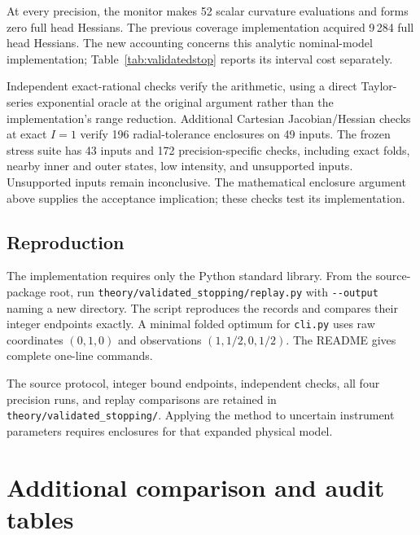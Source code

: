 \documentclass[10pt,a4paper]{article}
\begin{document}
At every precision, the monitor makes 52 scalar curvature evaluations and forms zero full head Hessians. The previous coverage implementation acquired 9\,284 full head Hessians. The new accounting concerns this analytic nominal-model implementation; Table~\ref{tab:validatedstop} reports its interval cost separately.

Independent exact-rational checks verify the arithmetic, using a direct Taylor-series exponential oracle at the original argument rather than the implementation's range reduction. Additional Cartesian Jacobian/Hessian checks at exact $I=1$ verify 196 radial-tolerance enclosures on 49 inputs. The frozen stress suite has 43 inputs and 172 precision-specific checks, including exact folds, nearby inner and outer states, low intensity, and unsupported inputs. Unsupported inputs remain inconclusive. The mathematical enclosure argument above supplies the acceptance implication; these checks test its implementation.

\subsection{Reproduction}
The implementation requires only the Python standard library. From the source-package root, run \nolinkurl{theory/validated_stopping/replay.py} with \nolinkurl{--output} naming a new directory. The script reproduces the records and compares their integer endpoints exactly. A minimal folded optimum for \nolinkurl{cli.py} uses raw coordinates $(0,1,0)$ and observations $(1,1/2,0,1/2)$. The README gives complete one-line commands.

The source protocol, integer bound endpoints, independent checks, all four precision runs, and replay comparisons are retained in \nolinkurl{theory/validated_stopping/}. Applying the method to uncertain instrument parameters requires enclosures for that expanded physical model.



\clearpage
\section{Additional comparison and audit tables}
\label{sec:extra_tables}
\end{document}
